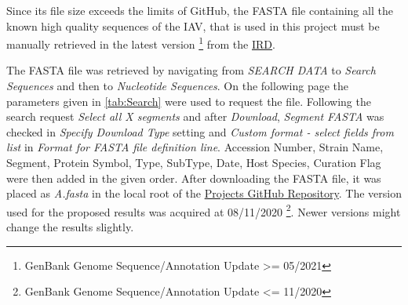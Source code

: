 Since its file size exceeds the limits of GitHub, the FASTA file containing all the known high quality sequences of the \gls{IAV}, that is used in this project must be manually retrieved in the latest version \footnote{GenBank Genome Sequence/Annotation Update >= 05/2021} from the \href{https://www.fludb.org/brc/home.spg?decorator=influenza}{\gls{IRD}}.

\begin{table}[!hbt]
    \centering
    \caption[Search Parameter for FASTA file]{\textbf{Search Parameter for FASTA file.} The parameters to use on the nucleotide sequence search interface of the \href{https://www.fludb.org/brc/home.spg?decorator=influenza}{Influenza Research Database}. All parameters have to be precisely as listed for a exact replication of the FASTA file used in this project.}
    \label{tab:Search}
\end{table}

The FASTA file was retrieved by navigating from \textit{SEARCH DATA} to \textit{Search Sequences} and then to \textit{Nucleotide Sequences}. On the following page the parameters given in \autoref{tab:Search} were used to request the file. Following the search request \textit{Select all X segments} and after \textit{Download}, \textit{Segment FASTA} was checked in \textit{Specify Download Type} setting and \textit{Custom format - select fields from list} in \textit{Format for FASTA file definition line}. Accession Number, Strain Name, Segment, Protein Symbol, Type, SubType, Date, Host Species, Curation Flag were then added in the given order. After downloading the FASTA file, it was placed as \textit{A.fasta} in the local root of the \href{https://github.com/ahenoch/Masterthesis.git}{Projects GitHub Repository}. The version used for the proposed results was acquired at 08/11/2020 \footnote{GenBank Genome Sequence/Annotation Update <= 11/2020 }. Newer versions might change the results slightly.

